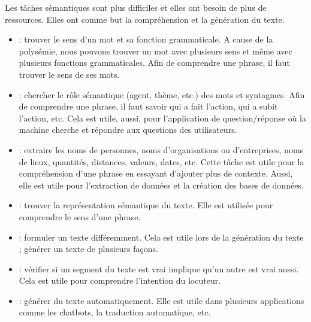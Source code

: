 \documentclass{KodeBook}
\begin{document}
Les tâches sémantiques sont plus difficiles et elles ont besoin de plus de ressources. 
Elles ont comme but la compréhension et la génération du texte. 
\begin{itemize}
	\item {} : trouver le sens d'un mot et sa fonction grammaticale. 
	A cause de la polysémie, nous pouvons trouver un mot avec plusieurs sens et même avec plusieurs fonctions grammaticales. 
	Afin de comprendre une phrase, il faut trouver le sens de ses mots.
	\item {} : chercher le rôle sémantique (agent, thème, etc.) des mots et syntagmes.
	Afin de comprendre une phrase, il faut savoir qui a fait l'action, qui a subit l'action, etc. 
	Cela est utile, aussi, pour l'application de question/réponse où la machine cherche et répondre aux questions des utilisateurs.
	\item {} : extraire les noms de personnes, noms d'organisations ou d'entreprises, noms de lieux, quantités, distances, valeurs, dates, etc. 
	Cette tâche est utile pour la compréhension d'une phrase en essayant d'ajouter plus de contexte. 
	Aussi, elle est utile pour l'extraction de données et la création des bases de données.
	\item {} : trouver la représentation sémantique du texte. 
	Elle est utilisée pour comprendre le sens d'une phrase.
	\item {} : formuler un texte différemment. 
	Cela est utile lors de la génération du texte ; générer un texte de plusieurs façons.
	\item {} : vérifier si un segment du texte est vrai implique qu'un autre est vrai aussi.
	Cela est utile pour comprendre l'intention du locuteur.
	\item {} : générer du texte automatiquement. 
	Elle est utile dans plusieurs applications comme les chatbots, la traduction automatique, etc.
\end{itemize}
\end{document}
